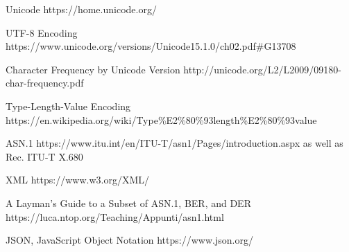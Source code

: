 \begin{thebibliography}{12}

\setlength{\leftskip}{-5cm}

  Unicode
  https://home.unicode.org/

  UTF-8 Encoding
  https://www.unicode.org/versions/Unicode15.1.0/ch02.pdf\#G13708

  Character Frequency by Unicode Version
  http://unicode.org/L2/L2009/09180-char-frequency.pdf

  Type-Length-Value Encoding
  https://en.wikipedia.org/wiki/Type\%E2\%80\%93length\%E2\%80\%93value

  ASN.1
  https://www.itu.int/en/ITU-T/asn1/Pages/introduction.aspx
  as well as Rec. ITU-T X.680

  XML
  https://www.w3.org/XML/

  A Layman's Guide to a Subset of ASN.1, BER, and DER
  https://luca.ntop.org/Teaching/Appunti/asn1.html

  JSON, JavaScript Object Notation
  https://www.json.org/

\setlength{\leftskip}{0cm}

\end{thebibliography}
